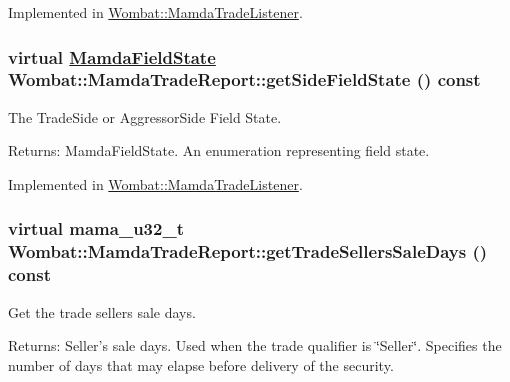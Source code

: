 Implemented in \hyperlink{classWombat_1_1MamdaTradeListener_e3cca817a27a4e6b9e5b699f548cd22a}{Wombat::Mamda\-Trade\-Listener}.\hypertarget{classWombat_1_1MamdaTradeReport_1ff93d3fe09098e58d436b2f273c1030}{
\subsubsection[getSideFieldState]{\setlength{\rightskip}{0pt plus 5cm}virtual \hyperlink{namespaceWombat_93aac974f2ab713554fd12a1fa3b7d2a}{Mamda\-Field\-State} Wombat::Mamda\-Trade\-Report::get\-Side\-Field\-State () const}}
\label{classWombat_1_1MamdaTradeReport_1ff93d3fe09098e58d436b2f273c1030}


The Trade\-Side or Aggressor\-Side Field State. 

\begin{Desc}
\item[Returns:]Mamda\-Field\-State. An enumeration representing field state. \end{Desc}


Implemented in \hyperlink{classWombat_1_1MamdaTradeListener_9943001740bebfecd4801267dac6daca}{Wombat::Mamda\-Trade\-Listener}.\hypertarget{classWombat_1_1MamdaTradeReport_c9ed0e49599c96128f6be2a1e3390a33}{
\subsubsection[getTradeSellersSaleDays]{\setlength{\rightskip}{0pt plus 5cm}virtual mama\_\-u32\_\-t Wombat::Mamda\-Trade\-Report::get\-Trade\-Sellers\-Sale\-Days () const}}
\label{classWombat_1_1MamdaTradeReport_c9ed0e49599c96128f6be2a1e3390a33}


Get the trade sellers sale days. 

\begin{Desc}
\item[Returns:]Seller's sale days. Used when the trade qualifier is \char`\"{}Seller\char`\"{}. Specifies the number of days that may elapse before delivery of the security. \end{Desc}


